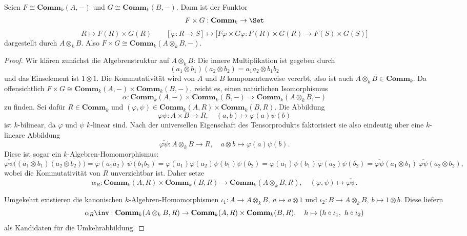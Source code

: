 \documentclass[11pt]{article}
\newcommand{\Comm}{\mathbf{Comm}}
\begin{document}
\begin{lemma} \Theorem Seien $F\cong \Comm_k(A,-)$ und $G\cong \Comm_k(B,-)$. Dann ist der Funktor
    $$F\times G: \Comm_k \to \Set$$
    $$R\mapsto F(R)\times G(R) \qquad [\varphi: R\to S] \mapsto \Big[F\varphi\times G\varphi: F(R)\times G(R) \to F(S)\times G(S)\Big]$$
    dargestellt durch $A\otimes_k B$. Also $F\times G\cong \Comm_k(A\otimes_k B, -)$.
    \begin{proof} Wir klären zunächst die Algebrenstruktur auf $A\otimes_k B$: Die innere Multiplikation ist gegeben durch
        $$(a_1\otimes b_1)(a_2\otimes b_2) = a_1a_2 \otimes b_1b_2$$
        und das Einselement ist $1\otimes 1$. Die Kommutativität wird von $A$ und $B$ komponentenweise vererbt, also ist auch $A\otimes_k B\in \Comm_k$.
        Da offensichtlich $F\times G \cong \Comm_k(A,-) \times \Comm_k(B,-)$, reicht es, einen natürlichen Isomorphismus
        $$\alpha: \Comm_k(A,-) \times \Comm_k(B,-) \Rightarrow \Comm_k(A\otimes_k B,-)$$
        zu finden. Sei dafür $R\in\Comm_k$ und $(\varphi,\psi)\in \Comm_k(A,R)\times\Comm_k(B,R)$. Die Abbildung
        $$\varphi\psi: A\times B \to R, \quad (a,b)\mapsto \varphi(a)\psi(b)$$
        ist $k$-bilinear, da $\varphi$ und $\psi$ $k$-linear sind. Nach der universellen Eigenschaft des Tensorprodukts faktorisiert sie also eindeutig über eine $k$-lineare Abbildung
        $$\overline{\varphi\psi}: A\otimes_k B \to R, \quad a\otimes b \mapsto \varphi(a)\psi(b).$$
        Diese ist sogar ein $k$-Algebren-Homomorphismus: 
        $$\overline{\varphi\psi}\big((a_1\otimes b_1)(a_2\otimes b_2)\big)
            = \varphi(a_1a_2)\,\psi(b_1b_2)
            = \varphi(a_1)\varphi(a_2)\psi(b_1)\psi(b_2)
            = \varphi(a_1)\psi(b_1)\,\varphi(a_2)\psi(b_2)
            = \overline{\varphi\psi}(a_1\otimes b_1)\,\overline{\varphi\psi}(a_2\otimes b_2),$$
        wobei die Kommutativität von $R$ unverzichtbar ist. Daher setze 
        $$\alpha_R: \Comm_k(A,R)\times\Comm_k(B,R) \to \Comm_k(A\otimes_k B,R), \quad (\varphi,\psi) \mapsto \overline{\varphi\psi}.$$

        Umgekehrt existieren die kanonischen $k$-Algebren-Homomorphismen $\iota_1: A \to A\otimes_k B,\ a \mapsto a\otimes 1$ und $\iota_2: B \to A\otimes_k B,\ b \mapsto 1\otimes b$. Diese liefern
        $$
            \alpha_R\inv: \Comm_k(A\otimes_k B, R) \to \Comm_k(A,R) \times \Comm_k(B,R), \quad h \mapsto (h\circ \iota_1,\ h\circ \iota_2)
        $$        
        als Kandidaten für die Umkehrabbildung.
        \newpage 
        

\end{proof}
\end{lemma}
\end{document}

